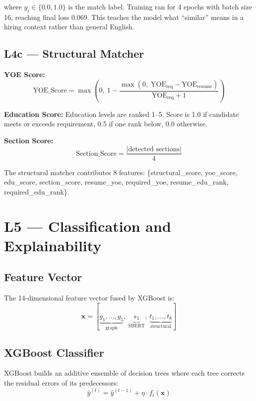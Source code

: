 \documentclass[12pt,a4paper]{report}
\begin{document}
where $y_i \in \{0.0, 1.0\}$ is the match label. Training ran for 4 epochs with batch size 16, reaching final loss 0.069. This teaches the model what ``similar'' means in a hiring context rather than general English.

\subsection{L4c --- Structural Matcher}

\textbf{YOE Score:}
\begin{equation}
\text{YOE\_Score} = \max\!\left(0,\ 1 - \frac{\max(0,\; \text{YOE}_\text{req} - \text{YOE}_\text{resume})}{\text{YOE}_\text{req} + 1}\right)
\end{equation}

\textbf{Education Score:} Education levels are ranked 1--5. Score is 1.0 if candidate meets or exceeds requirement, 0.5 if one rank below, 0.0 otherwise.

\textbf{Section Score:}
\begin{equation}
\text{Section\_Score} = \frac{|\text{detected sections}|}{4}
\end{equation}

The structural matcher contributes 8 features: \{structural\_score, yoe\_score, edu\_score, section\_score, resume\_yoe, required\_yoe, resume\_edu\_rank, required\_edu\_rank\}.

\section{L5 --- Classification and Explainability}

\subsection{Feature Vector}

The 14-dimensional feature vector fused by XGBoost is:
\begin{equation}
\mathbf{x} = [\underbrace{g_1,\ldots,g_5}_{\text{graph}},\ \underbrace{s_1}_{\text{SBERT}},\ \underbrace{t_1,\ldots,t_8}_{\text{structural}}]
\end{equation}

\subsection{XGBoost Classifier}

XGBoost \cite{chen2016} builds an additive ensemble of decision trees where each tree corrects the residual errors of its predecessors:
\begin{equation}
\hat{y}^{(t)} = \hat{y}^{(t-1)} + \eta \cdot f_t(\mathbf{x})
\end{equation}
\end{document}
